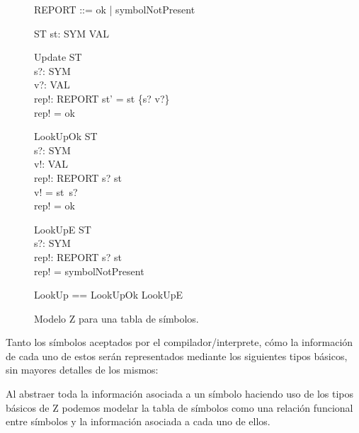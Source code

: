 \begin{figure}[H]
  \centering
    \begin{zed}
   \also
  REPORT ::= ok | symbolNotPresent
  \end{zed}

  \begin{schema}{ST}
  st: SYM \pfun VAL
  \end{schema}

  \begin{schema}{Update}
  \Delta ST \\
  s?: SYM \\
  v?: VAL \\
  rep!: REPORT
  \where
  st' = st \oplus \{s? \mapsto v?\} \\
  rep! = ok
  \end{schema}

  \begin{schema}{LookUpOk}
  \Xi ST \\
  s?: SYM \\
  v!: VAL \\
  rep!: REPORT
  \where
  s? \in \dom st \\
  v! = st~s? \\
  rep! = ok
  \end{schema}

  \begin{schema}{LookUpE}
  \Xi ST \\
  s?: SYM \\
  rep!: REPORT
  \where
  s? \notin \dom st \\
  rep! = symbolNotPresent
  \end{schema}

  \begin{zed}
  LookUp == LookUpOk \lor LookUpE
  \end{zed}

  \label{fig:spec_symbol_table}
  \caption{Modelo Z para una tabla de símbolos.}
\end{figure}

Tanto los símbolos aceptados por el compilador/interprete, cómo la información de cada uno de estos serán representados mediante los siguientes tipos básicos, sin mayores detalles de los mismos:

\begin{zed}
\end{zed}

Al abstraer toda la información asociada a un símbolo haciendo uso de los tipos básicos de Z podemos modelar la tabla de símbolos como una relación funcional entre símbolos y la información asociada a cada uno de ellos.
 
